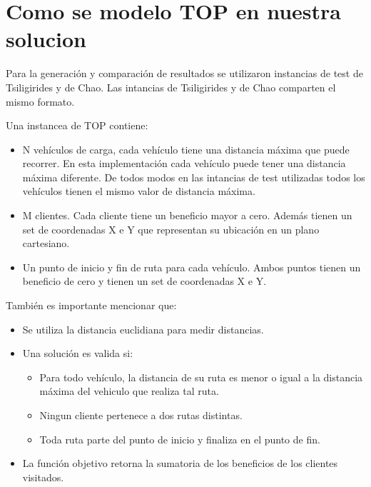 \section{Como se modelo TOP en nuestra solucion}

Para la generación y comparación de resultados se utilizaron instancias de test de Tsiligirides y de Chao. Las intancias de Tsiligirides y de Chao comparten el mismo formato. 

\bigskip

\begin{minipage}{\textwidth}
Una instancea de TOP contiene:

\begin{itemize}
  \item N vehículos de carga, cada vehículo tiene una distancia máxima que puede recorrer. En esta implementación cada vehículo puede tener una distancia máxima diferente. De todos modos en las intancias de test utilizadas todos los vehículos tienen el mismo valor de distancia máxima.
  \item M clientes. Cada cliente tiene un beneficio mayor a cero. Además tienen un set de coordenadas X e Y que representan su ubicación en un plano cartesiano.
  \item Un punto de inicio y fin de ruta para cada vehículo. Ambos puntos tienen un beneficio de cero y tienen un set de coordenadas X e Y.
\end{itemize}
\end{minipage}

\bigskip

\begin{minipage}{\textwidth}
También es importante mencionar que:

\begin{itemize}
	\item Se utiliza la distancia euclidiana para medir distancias.
	\item Una solución es valida si:
	\begin{itemize}
		\item Para todo vehículo, la distancia de su ruta es menor o igual a la distancia máxima del vehiculo que realiza tal ruta.
		\item Ningun cliente pertenece a dos rutas distintas.
		\item Toda ruta parte del punto de inicio y finaliza en el punto de fin.
	\end{itemize}
	\item La función objetivo retorna la sumatoria de los beneficios de los clientes visitados.
\end{itemize}
\end{minipage}





























